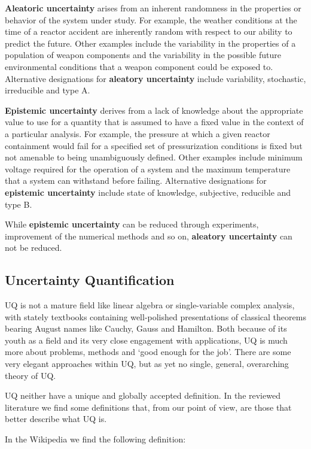 \textbf{Aleatoric uncertainty} arises from an inherent randomness in the properties or behavior of the system under study. For example, the weather conditions at the time of a reactor accident are inherently random with respect to our ability to predict the future. Other examples include the variability in the properties of a population of weapon components and the variability in the possible future environmental conditions that a weapon component could be exposed to. Alternative designations for \textbf{aleatory uncertainty} include variability, stochastic, irreducible and type A. \cite{Helton2009}

\textbf{Epistemic uncertainty} derives from a lack of knowledge about the appropriate value to use for a quantity that is assumed to have a fixed value in the context of a particular analysis. For example, the pressure at which a given reactor containment would fail for a specified set of pressurization conditions is fixed but not amenable to being unambiguously defined. Other examples include minimum voltage required for the operation of a system and the maximum temperature that a system can withstand before failing. Alternative designations for \textbf{epistemic uncertainty} include state of knowledge, subjective, reducible and type B. \cite{Helton2009}

While \textbf{epistemic uncertainty} can be reduced through experiments, improvement of the numerical methods and so on, \textbf{aleatory uncertainty} can not be reduced. 


\subsection{Uncertainty Quantification}

UQ is not a mature field like linear algebra or single-variable complex analysis, with stately textbooks containing well-polished presentations of classical theorems bearing August names like Cauchy, Gauss and Hamilton. Both because of its youth as a field and its very close engagement with applications, UQ is much more about problems, methods and ‘good enough for the job’. There are some very elegant approaches within UQ, but as yet no single, general, overarching theory of UQ. \cite{Sullivan2015}

UQ neither have a unique and globally accepted definition. In the reviewed literature we find some definitions that, from our point of view, are those that better describe what UQ is.  

In the Wikipedia we find the following definition: 

